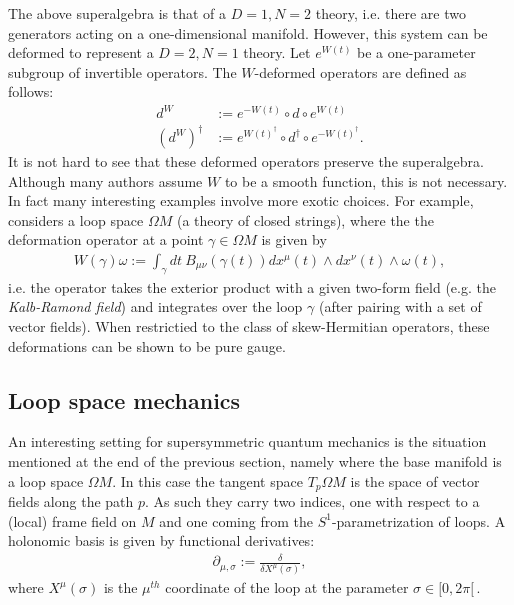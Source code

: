     The above superalgebra is that of a $D=1,N=2$ theory, i.e. there are two generators acting on a one-dimensional manifold. However, this system can be deformed to represent a $D=2,N=1$ theory. Let $e^{W(t)}$ be a one-parameter subgroup of invertible operators. The $W$-deformed operators are defined as follows:
    \begin{align}
        d^W &:= e^{-W(t)}\circ d\circ e^{W(t)}\\
        (d^W)^\dagger &:= e^{W(t)^\dagger}\circ d^\dagger\circ e^{-W(t)^\dagger}.
    \end{align}
    It is not hard to see that these deformed operators preserve the superalgebra. Although many authors assume $W$ to be a smooth function, this is not necessary. In fact many interesting examples involve more exotic choices. For example, \cite{phd_schreiber} considers a loop space $\Omega M$ (a theory of closed strings), where the the deformation operator at a point $\gamma\in\Omega M$ is given by
    \begin{gather}
        W(\gamma)\omega := \int_\gamma dt\ B_{\mu\nu}(\gamma(t))dx^\mu(t)\wedge dx^\nu(t)\wedge\omega(t),
    \end{gather}
    i.e. the operator takes the exterior product with a given two-form field (e.g. the \textit{Kalb-Ramond field}) and integrates over the loop $\gamma$ (after pairing with a set of vector fields). When restrictied to the class of skew-Hermitian operators, these deformations can be shown to be pure gauge.

\subsection{Loop space mechanics}

    An interesting setting for supersymmetric quantum mechanics is the situation mentioned at the end of the previous section, namely where the base manifold is a loop space $\Omega M$. In this case the tangent space $T_p\Omega M$ is the space of vector fields along the path $p$. As such they carry two indices, one with respect to a (local) frame field on $M$ and one coming from the $S^1$-parametrization of loops. A holonomic basis is given by functional derivatives:
    \begin{gather}
        \partial_{\mu,\sigma} := \frac{\delta}{\delta X^\mu(\sigma)},
    \end{gather}
    where $X^\mu(\sigma)$ is the $\mu^{th}$ coordinate of the loop at the parameter $\sigma\in[0,2\pi[\,$.



